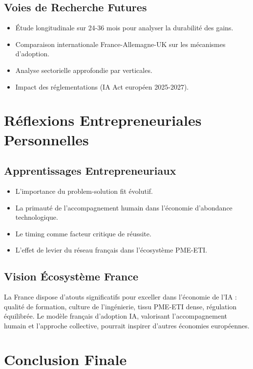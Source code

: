 \subsection{Voies de Recherche Futures}
\begin{itemize}
    \item Étude longitudinale sur 24-36 mois pour analyser la durabilité des gains.
    \item Comparaison internationale France-Allemagne-UK sur les mécanismes d'adoption.
    \item Analyse sectorielle approfondie par verticales.
    \item Impact des réglementations (IA Act européen 2025-2027).
\end{itemize}

\section{Réflexions Entrepreneuriales Personnelles}

\subsection{Apprentissages Entrepreneuriaux}
\begin{itemize}
    \item L'importance du problem-solution fit évolutif.
    \item La primauté de l'accompagnement humain dans l'économie d'abondance technologique.
    \item Le timing comme facteur critique de réussite.
    \item L'effet de levier du réseau français dans l'écosystème PME-ETI.
\end{itemize}

\subsection{Vision Écosystème France}
La France dispose d'atouts significatifs pour exceller dans l'économie de l'IA : qualité de formation, culture de l'ingénierie, tissu PME-ETI dense, régulation équilibrée. Le modèle français d'adoption IA, valorisant l'accompagnement humain et l'approche collective, pourrait inspirer d'autres économies européennes.

\section{Conclusion Finale}

